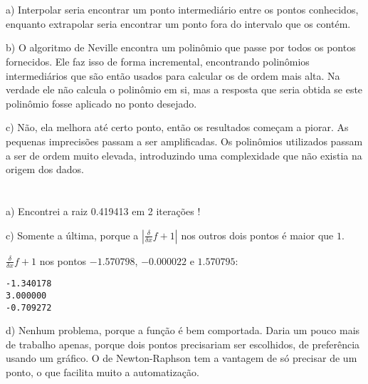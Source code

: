 \section{}
a) Interpolar seria encontrar um ponto intermediário entre os pontos conhecidos, enquanto extrapolar seria encontrar um ponto fora do intervalo que os contém.

b) O algoritmo de Neville encontra um polinômio que passe por todos os pontos fornecidos. Ele faz isso de forma incremental, encontrando polinômios intermediários que são então usados para calcular os de ordem mais alta. Na verdade ele não calcula o polinômio em si, mas a resposta que seria obtida se este polinômio fosse aplicado no ponto desejado.

c) Não, ela melhora até certo ponto, então os resultados começam a piorar. As pequenas imprecisões passam a ser amplificadas. Os polinômios utilizados passam a ser de ordem muito elevada, introduzindo uma complexidade que não existia na origem dos dados.

\section{}
a) Encontrei a raiz 0.419413 em 2 iterações !

c) Somente a última, porque a $|\frac{\delta}{\delta x}f + 1|$  nos outros dois pontos é maior que $1$.

$\frac{\delta}{\delta x}f + 1$ nos pontos $-1.570798$, 
$-0.000022$ e
$1.570795$:
\begin{verbatim}
-1.340178
3.000000
-0.709272
\end{verbatim}

d) Nenhum problema, porque a função é bem comportada. Daria um pouco mais de trabalho apenas, porque dois pontos precisariam ser escolhidos, de preferência usando um gráfico. O de Newton-Raphson tem a vantagem de só precisar de um ponto, o que facilita muito a automatização.



